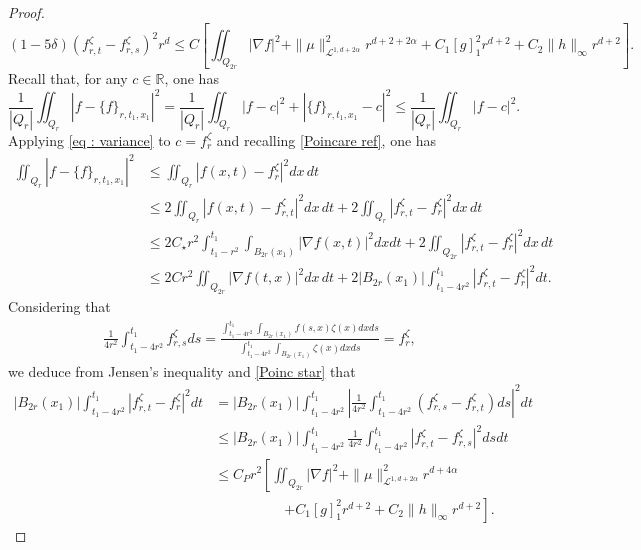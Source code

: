 \documentclass[reqno,12pt,twoside]{amsart}
\numberwithin{equation}{section} \numberwithin{theorem}{section}
\numberwithin{proposition}{section} \numberwithin{lemma}{section}
\numberwithin{corollary}{section}
\numberwithin{definition}{section} \numberwithin{remark}{section}
\begin{document}
\begin{proof}
\begin{equation}\label{Poinc star}
(1-5\delta)(f_{r,t}^\zeta - f_{r,s}^\zeta)^2r^d \leqslant C \left[\iint_{Q_{2r}} |\nabla f|^2 + \|\mu\|_{\mathcal{L}^{1, d+2\alpha}}^2 r^{d+2+2\alpha} + C_1[g]_1^2r^{d+2} + C_2\|h\|_\infty r^{d+2}\right] .
\end{equation}
Recall that, for any $c\in \mathbb{R}$, one has 
\begin{equation}\label{eq : variance}
\frac{1}{|Q_r|}\iint_{Q_r} |f - \{f\}_{r,t_1,x_1}|^2 = \frac{1}{|Q_r|}\iint_{Q_r} |f - c|^2 + |\{f\}_{r,t_1,x_1} - c|^2 \leqslant \frac{1}{|Q_r|}\iint_{Q_r} |f - c|^2.
\end{equation}
Applying \eqref{eq : variance} to $c= f_r^{\zeta}$ 
and recalling \eqref{Poincare ref}, one has 
\begin{align}\label{Poinc 7}
\iint_{Q_r} |f - \{f\}_{r,t_1,x_1}|^2 &\leqslant \iint_{Q_r} |f(x,t) - f_r^\zeta|^2 dx\, dt \nonumber\\
&\leqslant 2 \iint_{Q_r} |f(x,t) - f_{r,t}^\zeta|^2 dx\, dt + 2\iint_{Q_r} |f_{r,t}^\zeta - f_r^\zeta|^2 dx \,dt \nonumber\\
&\leqslant 2 C_\star r^2 \int_{t_1 -r^2}^{t_1} \int_{B_{2r}(x_1)} |\nabla f (x,t)|^2 dx dt +2\iint_{Q_{2r}} |f_{r,t}^\zeta - f_r^\zeta|^2 dx\, dt \nonumber\\
&\leqslant  2 Cr^2 \iint_{Q_{2r}} |\nabla f(t,x)|^2dx\, dt + 2|B_{2r}(x_1)| \int_{t_1 -4r^2}^{t_1}  |f_{r,t}^\zeta - f_r^\zeta|^2 dt.
\end{align} 
%
Considering that 
\begin{align*}
\frac{1}{4r^2} \int_{t_1-4r^2}^{t_1} f_{r,s}^\zeta ds = \frac{\int_{t_1-4r^2}^{t_1} \int_{B_{2r}(x_1)} f (s,x) \zeta(x) dx ds}{\int_{t_1-4r^2}^{t_1} \int_{B_{2r}(x_1)} \zeta(x) dx ds} = f_r^\zeta,
\end{align*}
we deduce from Jensen's inequality and \eqref{Poinc star} that 
\begin{align}\label{Poinc 8}
|B_{2r}(x_1)| \int_{t_1 -4r^2}^{t_1}  |f_{r,t}^\zeta - f_r^\zeta|^2 dt &= |B_{2r}(x_1)|\int_{t_1 -4r^2}^{t_1}\left|\frac{1}{4r^2} \int_{t_1-4r^2}^{t_1} (f_{r,s}^\zeta - f_{r,t}^\zeta)ds \right|^2dt \nonumber\\
&\leqslant |B_{2r}(x_1)| \int_{t_1 -4r^2}^{t_1} \frac{1}{4r^2}\int_{t_1 -4r^2}^{t_1} |f_{r,t}^\zeta - f_{r,s}^\zeta|^2 ds dt \nonumber\\
&\leqslant C_P r^2 \left[\iint_{Q_{2r}} |\nabla f|^2 + \|\mu\|_{\mathcal{L}^{1, d+2\alpha}}^2 r^{d+4\alpha}\right. \nonumber\\
& \quad \quad \quad \quad \quad \left. + C_1[g]_1^2r^{d+2} + C_2\|h\|_\infty r^{d+2}\right].
\end{align}


\end{proof}
\end{document}
